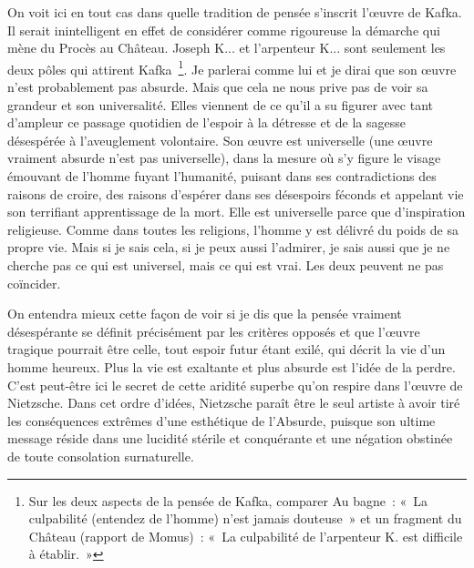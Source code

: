 \documentclass{book}
\begin{document}
On voit ici en tout cas dans quelle tradition de pensée s'inscrit l'œuvre de Kafka. Il serait inintelligent en effet de considérer comme rigoureuse la démarche qui mène du Procès au Château. Joseph K... et l'arpenteur K... sont seulement les deux pôles qui attirent Kafka \footnote{Sur les deux aspects de la pensée de Kafka, comparer Au bagne : « La culpabilité (entendez de l'homme) n'est jamais douteuse » et un fragment du Château (rapport de Momus) : « La culpabilité de l'arpenteur K. est difficile à établir. »}. Je parlerai comme lui et je dirai que son œuvre n'est probablement pas absurde. Mais que cela ne nous prive pas de voir sa grandeur et son universalité. Elles viennent de ce qu'il a su figurer avec tant d'ampleur ce passage quotidien de l'espoir à la détresse et de la sagesse désespérée à l'aveuglement volontaire. Son œuvre est universelle (une œuvre vraiment absurde n'est pas universelle), dans la mesure où s'y figure le visage émouvant de l'homme fuyant l'humanité, puisant dans ses contradictions des raisons de croire, des raisons d'espérer dans ses désespoirs féconds et appelant vie son terrifiant apprentissage de la mort. Elle est universelle parce que d'inspiration religieuse. Comme dans toutes les religions, l'homme y est délivré du poids de sa propre vie. Mais si je sais cela, si je peux aussi l'admirer, je sais aussi que je ne cherche pas ce qui est universel, mais ce qui est vrai. Les deux peuvent ne pas coïncider.

On entendra mieux cette façon de voir si je dis que la pensée vraiment désespérante se définit précisément par les critères opposés et que l'œuvre tragique pourrait être celle, tout espoir futur étant exilé, qui décrit la vie d'un homme heureux. Plus la vie est exaltante et plus absurde est l'idée de la perdre. C'est peut-être ici le secret de cette aridité superbe qu'on respire dans l'œuvre de Nietzsche. Dans cet ordre d'idées, Nietzsche paraît être le seul artiste à avoir tiré les conséquences extrêmes d'une esthétique de l'Absurde, puisque son ultime message réside dans une lucidité stérile et conquérante et une négation obstinée de toute consolation surnaturelle.
\end{document}
